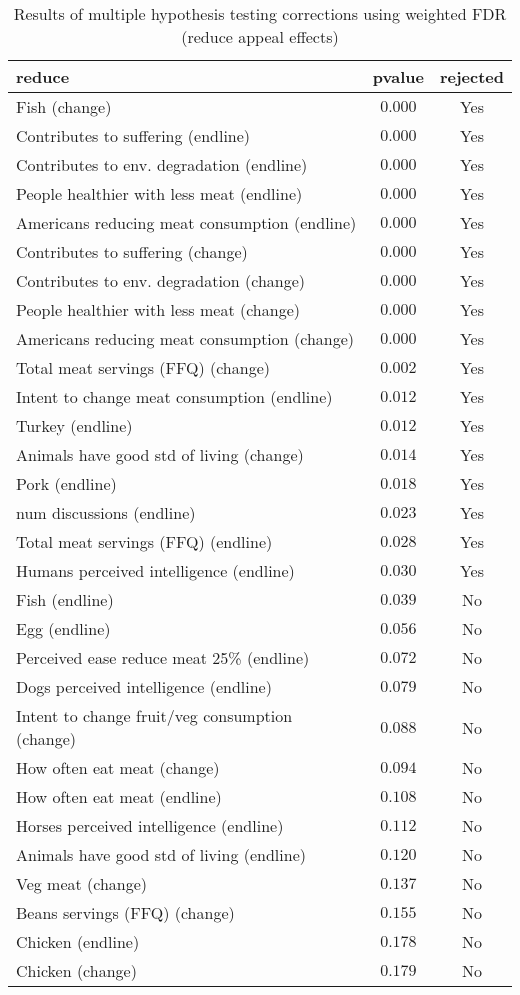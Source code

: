 \begin{table*}[ht]
\caption{Results of multiple hypothesis testing corrections using weighted FDR (reduce appeal effects)\label{reduce}} 
\begin{center}
\begin{tabular}{lcc}
\hline\hline
\multicolumn{1}{l}{reduce}&\multicolumn{1}{c}{pvalue}&\multicolumn{1}{c}{rejected}\tabularnewline
\hline
Fish (change)&$0.000$&Yes\tabularnewline
Contributes to suffering (endline)&$0.000$&Yes\tabularnewline
Contributes to env. degradation (endline)&$0.000$&Yes\tabularnewline
People healthier with less meat (endline)&$0.000$&Yes\tabularnewline
Americans reducing meat consumption (endline)&$0.000$&Yes\tabularnewline
Contributes to suffering (change)&$0.000$&Yes\tabularnewline
Contributes to env. degradation (change)&$0.000$&Yes\tabularnewline
People healthier with less meat (change)&$0.000$&Yes\tabularnewline
Americans reducing meat consumption (change)&$0.000$&Yes\tabularnewline
Total meat servings (FFQ) (change)&$0.002$&Yes\tabularnewline
Intent to change meat consumption (endline)&$0.012$&Yes\tabularnewline
Turkey (endline)&$0.012$&Yes\tabularnewline
Animals have good std of living (change)&$0.014$&Yes\tabularnewline
Pork (endline)&$0.018$&Yes\tabularnewline
num discussions (endline)&$0.023$&Yes\tabularnewline
Total meat servings (FFQ) (endline)&$0.028$&Yes\tabularnewline
Humans perceived intelligence (endline)&$0.030$&Yes\tabularnewline
Fish (endline)&$0.039$&No\tabularnewline
Egg (endline)&$0.056$&No\tabularnewline
Perceived ease reduce meat 25\% (endline)&$0.072$&No\tabularnewline
Dogs perceived intelligence (endline)&$0.079$&No\tabularnewline
Intent to change fruit/veg consumption (change)&$0.088$&No\tabularnewline
How often eat meat (change)&$0.094$&No\tabularnewline
How often eat meat (endline)&$0.108$&No\tabularnewline
Horses perceived intelligence (endline)&$0.112$&No\tabularnewline
Animals have good std of living (endline)&$0.120$&No\tabularnewline
Veg meat (change)&$0.137$&No\tabularnewline
Beans servings (FFQ) (change)&$0.155$&No\tabularnewline
Chicken (endline)&$0.178$&No\tabularnewline
Chicken (change)&$0.179$&No\tabularnewline
\hline
\end{tabular}\end{center}

\end{table*}
